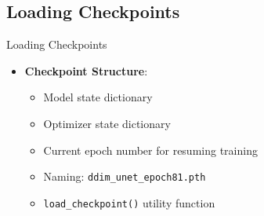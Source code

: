 \subsection{Loading Checkpoints}
\begin{frame}{Loading Checkpoints}
    \begin{itemize}
        \item \textbf{Checkpoint Structure}:
              \begin{itemize}
                  \item Model state dictionary
                  \item Optimizer state dictionary
                  \item Current epoch number for resuming training
                  \item Naming: \texttt{ddim\_unet\_epoch81.pth}
                  \item \texttt{load\_checkpoint()} utility function
              \end{itemize}
    \end{itemize}
\end{frame}